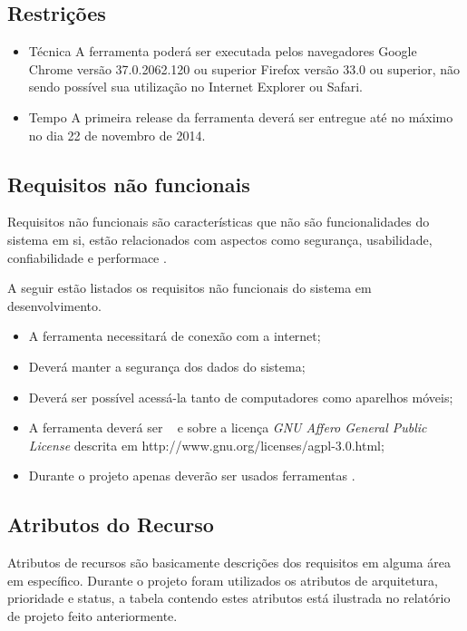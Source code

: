 \subsection{Restrições}

\begin{itemize}
	\item Técnica
		A ferramenta poderá ser executada pelos navegadores Google Chrome versão 37.0.2062.120 ou superior Firefox versão 33.0 ou superior, não sendo possível sua utilização no Internet Explorer ou Safari.
	\item Tempo
		A primeira release da ferramenta deverá ser entregue até no máximo no dia 22 de novembro de 2014.
\end{itemize}

\subsection{Requisitos não funcionais}

Requisitos não funcionais são características que não são funcionalidades do sistema em si, estão relacionados com aspectos como segurança, usabilidade, confiabilidade e performace \cite{derequisitos}.

A seguir estão listados os requisitos não funcionais do sistema em desenvolvimento.

\begin{itemize}
	\item A ferramenta necessitará de conexão com a internet;
	\item Deverá manter a segurança dos dados do sistema;
	\item Deverá ser possível acessá-la tanto de computadores como aparelhos móveis;
	\item A ferramenta deverá ser \opensource~ e sobre a licença \textit{GNU Affero General Public License} descrita em http://www.gnu.org/licenses/agpl-3.0.html;
	\item Durante o projeto apenas deverão ser usados ferramentas \opensource.
\end{itemize}


\subsection{Atributos do Recurso}

Atributos de recursos são basicamente descrições dos requisitos em alguma área em específico. Durante o projeto foram utilizados os atributos de arquitetura, prioridade e status, a tabela contendo estes atributos está ilustrada no relatório de projeto feito anteriormente.